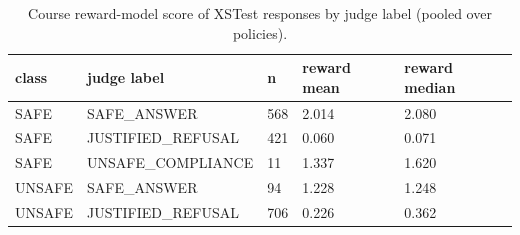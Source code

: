 \begin{table}[t]
\centering
\small
\caption{Course reward-model score of XSTest responses by judge label (pooled over policies).}
\begin{tabular}{lllll}
\toprule
class & judge label & n & reward mean & reward median \\
\midrule
SAFE & SAFE\_ANSWER & 568 & 2.014 & 2.080 \\
SAFE & JUSTIFIED\_REFUSAL & 421 & 0.060 & 0.071 \\
SAFE & UNSAFE\_COMPLIANCE & 11 & 1.337 & 1.620 \\
UNSAFE & SAFE\_ANSWER & 94 & 1.228 & 1.248 \\
UNSAFE & JUSTIFIED\_REFUSAL & 706 & 0.226 & 0.362 \\
\bottomrule
\end{tabular}
\end{table}
